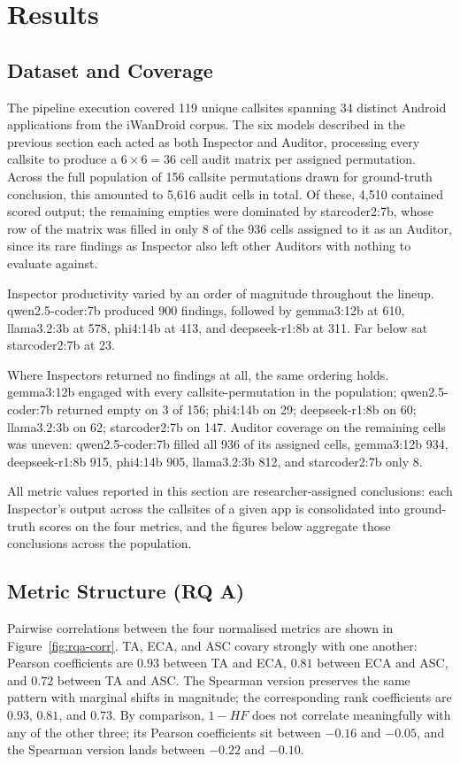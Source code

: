 \section{Results}

\subsection{Dataset and Coverage}
The pipeline execution covered 119 unique callsites spanning 34 distinct Android applications from the iWanDroid corpus. The six models described in the previous section each acted as both Inspector and Auditor, processing every callsite to produce a $6 \times 6 = 36$ cell audit matrix per assigned permutation. Across the full population of 156 callsite permutations drawn for ground-truth conclusion, this amounted to 5{,}616 audit cells in total. Of these, 4{,}510 contained scored output; the remaining empties were dominated by starcoder2:7b, whose row of the matrix was filled in only 8 of the 936 cells assigned to it as an Auditor, since its rare findings as Inspector also left other Auditors with nothing to evaluate against.

Inspector productivity varied by an order of magnitude throughout the lineup. qwen2.5-coder:7b produced 900 findings, followed by gemma3:12b at 610, llama3.2:3b at 578, phi4:14b at 413, and deepseek-r1:8b at 311. Far below sat starcoder2:7b at 23.

Where Inspectors returned no findings at all, the same ordering holds. gemma3:12b engaged with every callsite-permutation in the population; qwen2.5-coder:7b returned empty on 3 of 156; phi4:14b on 29; deepseek-r1:8b on 60; llama3.2:3b on 62; starcoder2:7b on 147. Auditor coverage on the remaining cells was uneven: qwen2.5-coder:7b filled all 936 of its assigned cells, gemma3:12b 934, deepseek-r1:8b 915, phi4:14b 905, llama3.2:3b 812, and starcoder2:7b only 8.

All metric values reported in this section are researcher-assigned conclusions: each Inspector's output across the callsites of a given app is consolidated into ground-truth scores on the four metrics, and the figures below aggregate those conclusions across the population.

\subsection{Metric Structure (RQ A)}
Pairwise correlations between the four normalised metrics are shown in Figure~\ref{fig:rqa-corr}. TA, ECA, and ASC covary strongly with one another: Pearson coefficients are $0.93$ between TA and ECA, $0.81$ between ECA and ASC, and $0.72$ between TA and ASC. The Spearman version preserves the same pattern with marginal shifts in magnitude; the corresponding rank coefficients are $0.93$, $0.81$, and $0.73$. By comparison, $1{-}HF$ does not correlate meaningfully with any of the other three; its Pearson coefficients sit between $-0.16$ and $-0.05$, and the Spearman version lands between $-0.22$ and $-0.10$.

